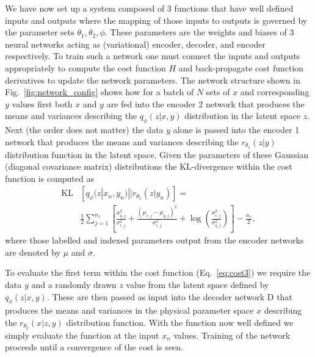 \documentclass[%
showpacs,
 amsmath,amssymb,
 aps,
 twocolumn,
 prl,
 reprint,
floatfix,
]{revtex4-1}
\begin{document}
We have now set up a system composed of 3 functions that have well defined
inputs and outputs where the mapping of those inputs to outputs is governed by
the parameter sets $\theta_{1},\theta_{2},\phi$. These parameters are the
weights and biases of 3 neural networks acting as (variational) encoder,
decoder, and encoder respectively. To train such a network one must connect the
inputs and outputs appropriately to compute the cost function $H$ and
back-propagate cost function derivatives to update the network parameters. The
network structure shown in Fig.~\ref{fig:network_config} shows how for a batch
of $N$ sets of $x$ and corresponding $y$ values first both $x$ and $y$ are fed
into the encoder 2 network that produces the means and variances describing the
$q_{\phi}(z|x,y)$ distribution in the latent space $z$. Next (the order does
not matter) the data $y$ alone is passed into the encoder 1 network that
produces the means and variances describing the $r_{\theta_{1}}(z|y)$
distribution function in the latent space. Given the parameters of these
Gaussian (diagonal covariance matrix) distributions the $\text{KL}$-divergence
within the cost function is computed as
%
\begin{align}\label{eq:klgauss}
\text{KL}&\left[q_{\phi}(z|x_{n},y_{n})||r_{\theta_{1}}(z|y_{n})\right] = \\
&\frac{1}{2}\sum_{j=1}^{n_{z}}\left[\frac{\sigma_{q,j}^{2}}{\sigma_{r,j}^{2}} +
\frac{(\mu_{r,j}-\mu_{q,j})^{2}}{\sigma_{r,j}^{2}}+
\log\left(\frac{\sigma_{r,j}^{2}}{\sigma_{q,j}^{2}}\right)\right] -
\frac{n_{z}}{2},\nonumber \end{align}
%
where those labelled and indexed parameters output from the encoder networks
are denoted by $\mu$ and $\sigma$.

To evaluate the first term within the cost function (Eq.~\ref{eq:cost3}) we
require the data $y$ and a randomly drawn $z$ value from the latent space defined
by $q_{\phi}(z|x,y)$. These are then passed as input into the decoder network D
that produces the means and variances in the physical parameter space $x$ describing
the $r_{\theta_{2}}(x|z,y)$ distribution function. With the function now well
defined we simply evaluate the function at the input $x_{n}$
values. Training of the network proceeds until a convergence of the cost is
seen. 
\end{document}
